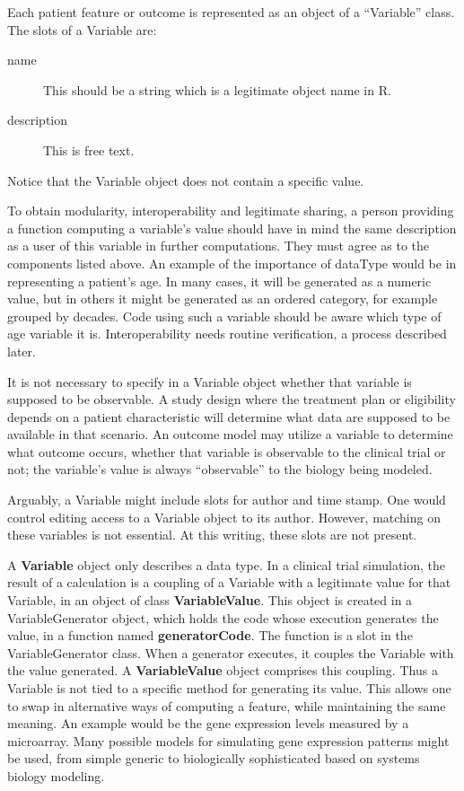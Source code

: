 \documentclass[12pt]{amsart}
\newcommand{\Rcode}[1]{{\textbf{#1}}}
\def\code<#1>{\textbf{#1}}
\begin{document}
Each patient feature or outcome is represented as an object of a ``Variable'' class.
The slots of a Variable are:
\begin{description}
\item[ name] This should be a string which is a legitimate object name in R.  
\item[ description] This is free text.
\end{description}

Notice that the Variable object does not contain a specific value.

To obtain modularity, interoperability and legitimate sharing, 
a person providing a function computing a variable's value
should have in mind the same description 
as a user of this variable in further computations.
They must agree as to the components listed above.
An example of the importance of  dataType would be in representing a patient's age.
In many cases, it will be generated as a numeric value, but in others it might
be generated as an ordered category, for example grouped by decades. 
Code using such a variable should be aware which type of age variable it is.
Interoperability needs routine verification, a process described later.

It is not necessary to specify in a Variable object whether that variable 
is supposed to be observable.
A study design where the treatment plan or eligibility depends on a patient
characteristic will determine what data are supposed to be available in that scenario.
An outcome model may utilize a variable to determine what outcome occurs,
whether that variable is  observable to the clinical trial or not;
the variable's value is always ``observable'' to the biology being modeled.

Arguably, a Variable might include slots for author and time stamp.
One would control editing access to a Variable object to its author.
However, matching on these variables is not essential.
At this writing, these slots are not present.

A \code<Variable> object only describes a data type. 
In a clinical trial simulation, 
the result of a calculation is a coupling of
a Variable with a legitimate value for that Variable, in an object of class \Rcode{VariableValue}.
This object is created in a VariableGenerator object,
which holds the code whose execution generates the value,
in a function named \code<generatorCode>.
The function is a slot in the   VariableGenerator class.
When a generator executes, it couples the Variable with the value generated.
A \Rcode{VariableValue} object comprises this coupling.
Thus a Variable is not tied to a specific method for generating its value.
This allows one to swap in alternative ways of computing a feature,
while maintaining the same meaning.
An example would be the gene expression levels measured by a microarray.
Many possible models for simulating gene expression patterns might be used,
from simple generic to biologically sophisticated based on systems biology modeling.
\end{document}
